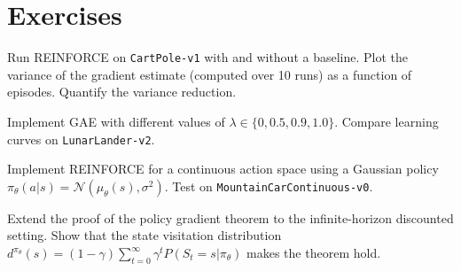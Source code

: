 \section{Exercises}
\label{sec:pg:exercises}

\begin{exercise}
Run REINFORCE on \texttt{CartPole-v1} with and without a baseline.
Plot the variance of the gradient estimate (computed over 10 runs)
as a function of episodes. Quantify the variance reduction.
\end{exercise}

\begin{exercise}
Implement GAE with different values of $\lambda \in \{0, 0.5, 0.9, 1.0\}$.
Compare learning curves on \texttt{LunarLander-v2}.
\end{exercise}

\begin{exercise}
Implement REINFORCE for a continuous action space using a Gaussian policy
$\pi_\theta(a|s) = \mathcal{N}(\mu_\theta(s), \sigma^2)$. Test on
\texttt{MountainCarContinuous-v0}.
\end{exercise}

\begin{exercise}
Extend the proof of the policy gradient theorem to the infinite-horizon
discounted setting. Show that the state visitation distribution
$d^{\pi_\theta}(s) = (1-\gamma) \sum_{t=0}^\infty \gamma^t P(S_t = s | \pi_\theta)$
makes the theorem hold.
\end{exercise}
